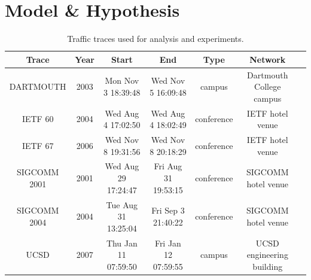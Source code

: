 \documentclass[conference]{IEEEtran}
\begin{document}
\section{Model \& Hypothesis}

\begin{table}
\begin{center}
\small
\begin{tabular}{|c|c|c|c|c|c|c|}

\hline
\textbf{Trace} &
\textbf{Year} &
\textbf{Start} &
\textbf{End} &
\textbf{Type} &
\textbf{Network} \\
\hline

{\footnotesize{DARTMOUTH}} &
2003 &
Mon Nov  3 18:39:48 &
Wed Nov  5 16:09:48 &
campus &
Dartmouth College campus \\
\hline

{\footnotesize{IETF 60}} &
2004 &
Wed Aug  4 17:02:50 &
Wed Aug  4 18:02:49 &
conference &
IETF hotel venue \\
\hline

{\footnotesize{IETF 67}} &
2006 &
Wed Nov  8 19:31:56 &
Wed Nov  8 20:18:29 &
conference &
IETF hotel venue \\
\hline

{\footnotesize{SIGCOMM 2001}} &
2001 &
Wed Aug 29 17:24:47 &
Fri Aug 31 19:53:15 &
conference &
SIGCOMM hotel venue \\
\hline

{\footnotesize{SIGCOMM 2004}} &
2004 &
Tue Aug 31 13:25:04 &
Fri Sep  3 21:40:22 &
conference &
SIGCOMM hotel venue \\
\hline

{\footnotesize{UCSD}} &
2007 &
Thu Jan 11 07:59:50 &
Fri Jan 12 07:59:55 &
campus &
UCSD engineering building \\
\hline

\end{tabular}
\caption{Traffic traces used for analysis and experiments.}
\end{center}
\vspace{-2em}
\end{table}
\end{document}

